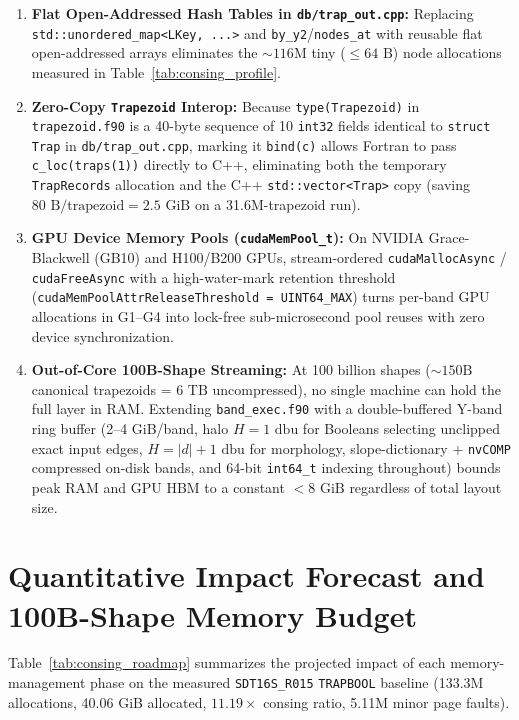 \begin{enumerate}
  \item \textbf{Flat Open-Addressed Hash Tables in \texttt{db/trap\_out.cpp}:} Replacing \texttt{std::unordered\_map<LKey, ...>} and \texttt{by\_y2}/\texttt{nodes\_at} with reusable flat open-addressed arrays eliminates the $\sim 116\text{M}$ tiny ($\le 64\text{ B}$) node allocations measured in Table~\ref{tab:consing_profile}.
  \item \textbf{Zero-Copy \texttt{Trapezoid} Interop:} Because \texttt{type(Trapezoid)} in \texttt{trapezoid.f90} is a 40-byte sequence of 10 \texttt{int32} fields identical to \texttt{struct Trap} in \texttt{db/trap\_out.cpp}, marking it \texttt{bind(c)} allows Fortran to pass \texttt{c\_loc(traps(1))} directly to C++, eliminating both the temporary \texttt{TrapRecords} allocation and the C++ \texttt{std::vector<Trap>} copy (saving $80\text{ B/trapezoid} = 2.5\text{ GiB}$ on a 31.6M-trapezoid run).
  \item \textbf{GPU Device Memory Pools (\texttt{cudaMemPool\_t}):} On NVIDIA Grace-Blackwell (GB10) and H100/B200 GPUs, stream-ordered \texttt{cudaMallocAsync} / \texttt{cudaFreeAsync} with a high-water-mark retention threshold (\texttt{cudaMemPoolAttrReleaseThreshold = UINT64\_MAX}) turns per-band GPU allocations in G1--G4 into lock-free sub-microsecond pool reuses with zero device synchronization.
  \item \textbf{Out-of-Core 100B-Shape Streaming:} At 100 billion shapes ($\sim 150\text{B}$ canonical trapezoids = $6\text{ TB}$ uncompressed), no single machine can hold the full layer in RAM. Extending \texttt{band\_exec.f90} with a double-buffered Y-band ring buffer (2--4 GiB/band, halo $H = 1\text{ dbu}$ for Booleans selecting unclipped exact input edges, $H = |d| + 1\text{ dbu}$ for morphology, slope-dictionary + \texttt{nvCOMP} compressed on-disk bands, and 64-bit \texttt{int64\_t} indexing throughout) bounds peak RAM and GPU HBM to a constant $< 8\text{ GiB}$ regardless of total layout size.
\end{enumerate}

\section{Quantitative Impact Forecast and 100B-Shape Memory Budget}

Table~\ref{tab:consing_roadmap} summarizes the projected impact of each memory-management phase on the measured \texttt{SDT16S\_R015} \texttt{TRAPBOOL} baseline (133.3M allocations, 40.06 GiB allocated, $11.19\times$ consing ratio, 5.11M minor page faults).

